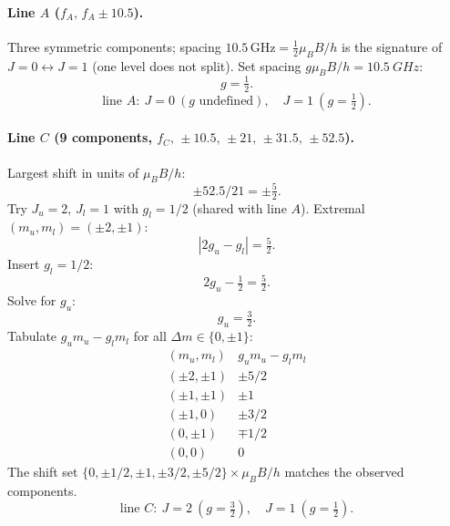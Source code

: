 \documentclass[11pt]{article}
\begin{document}
\paragraph{Line $A$ ($f_{A},\,f_{A}\pm 10.5$).} Three symmetric components; spacing $10.5\,\text{GHz}=\tfrac{1}{2}\mu_{B}B/h$ is the signature of $J=0\leftrightarrow J=1$ (one level does not split).
Set spacing $g\mu_{B}B/h=\SI{10.5}{GHz}$:
\begin{equation}
g=\tfrac{1}{2}.
\end{equation}
\begin{equation}
\boxed{\;\text{line }A:\ J=0\ (g\text{ undefined}),\quad J=1\ (g=\tfrac{1}{2}).\;}
\label{eq:lineA-Jg}
\end{equation}

\paragraph{Line $C$ (9 components, $f_{C},\,\pm 10.5,\,\pm 21,\,\pm 31.5,\,\pm 52.5$).} Largest shift in units of $\mu_{B}B/h$:
\begin{equation}
\pm 52.5/21=\pm\tfrac{5}{2}.
\end{equation}
Try $J_{u}=2,\,J_{l}=1$ with $g_{l}=1/2$ (shared with line $A$). Extremal $(m_{u},m_{l})=(\pm 2,\pm 1)$:
\begin{equation}
|2g_{u}-g_{l}|=\tfrac{5}{2}.
\end{equation}
Insert $g_{l}=1/2$:
\begin{equation}
2g_{u}-\tfrac{1}{2}=\tfrac{5}{2}.
\end{equation}
Solve for $g_{u}$:
\begin{equation}
g_{u}=\tfrac{3}{2}.
\end{equation}
Tabulate $g_{u}m_{u}-g_{l}m_{l}$ for all $\Delta m\in\{0,\pm 1\}$:
\begin{equation}
\begin{array}{c|c}
(m_{u},m_{l}) & g_{u}m_{u}-g_{l}m_{l} \\ \hline
(\pm 2,\pm 1) & \pm 5/2 \\
(\pm 1,\pm 1) & \pm 1 \\
(\pm 1,0) & \pm 3/2 \\
(0,\pm 1) & \mp 1/2 \\
(0,0) & 0
\end{array}
\label{eq:lineC-table}
\end{equation}
The shift set $\{0,\pm 1/2,\pm 1,\pm 3/2,\pm 5/2\}\times\mu_{B}B/h$ matches the observed components.
\begin{equation}
\boxed{\;\text{line }C:\ J=2\ (g=\tfrac{3}{2}),\quad J=1\ (g=\tfrac{1}{2}).\;}
\label{eq:lineC-Jg}
\end{equation}
\end{document}
